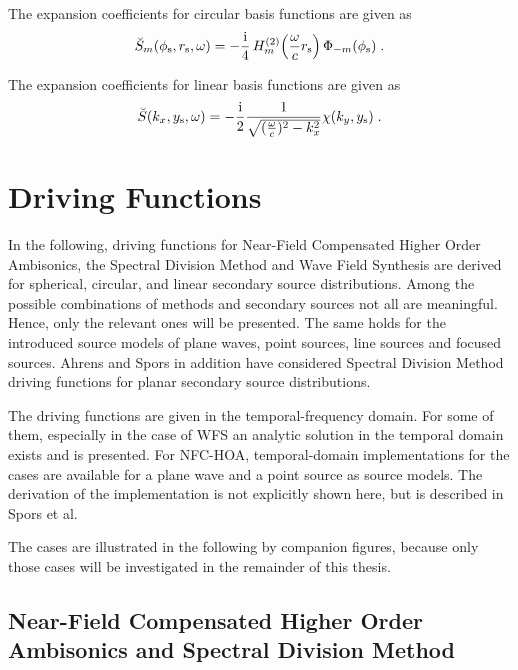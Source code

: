 The expansion coefficients for circular basis functions are given as
%
\begin{equation}
    \breve{S}_m(\phi_\text{s},r_\text{s},\omega) = -\frac{\I}{4}
    \H{m}{2} \left(\omegac r_\text{s}\right)
    \Phi_{-m}(\phi_\text{s}) \qp
    \label{eq:line_source_circular}
\end{equation}
%

The expansion coefficients for linear basis functions are given as
%
\begin{equation}
    \breve{S}(k_x,y_\text{s},\omega) = -\frac{\I}{2} \frac{1}{\sqrt{(\omegac)^2-k_x^2}}
    \chi(k_y,y_\text{s})\qp
    \label{eq:line_source_linear}
\end{equation}
%

\section{Driving Functions}
\label{sec:driving_functions}

In the following, driving functions for Near-Field Compensated High\-er Order
Ambisonics, the Spectral Division Method and Wave Field Synthesis are derived
for spherical, circular, and linear secondary source distributions. Among the
possible combinations of methods and secondary sources not all are
meaningful. Hence, only the relevant ones will be presented. The same holds for the
introduced source models of plane waves, point sources, line sources and focused
sources.
Ahrens and
Spors
in addition have considered Spectral Division Method driving functions for
planar secondary source distributions.

The driving functions are given in the temporal-frequency domain. For some of them,
especially in the case of \ac{WFS} an analytic solution in the temporal
domain exists and is presented. For \ac{NFC-HOA}, temporal-domain implementations
for the \twohalfD cases are available for a plane wave and a point source as source models. The
derivation of the implementation is not explicitly shown here, but is described
in Spors et al.

The \twohalfD cases are illustrated in the following by companion
figures, because only those cases will be investigated in the remainder of this
thesis.

\subsection{Near-Field Compensated Higher Order Ambisonics and Spectral Division Method}
\label{sec:driving_functions_hoa}


